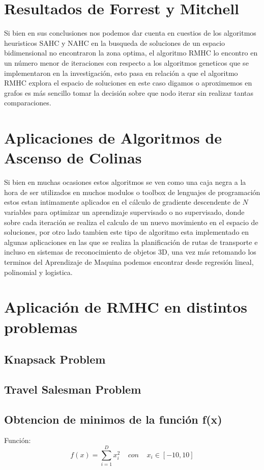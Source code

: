 \documentclass[10pt]{article}
\begin{document}
\section{Resultados de Forrest y Mitchell}
Si bien en sus conclusiones nos podemos dar cuenta en cuestios de los algoritmos heuristicos SAHC y NAHC en la busqueda de soluciones de un espacio bidimensional no encontraron la zona optima, el algoritmo RMHC lo encontro en un número menor de iteraciones con respecto a los algoritmos geneticos que se implementaron en la investigación, esto pasa en relación a que el algoritmo RMHC explora el espacio de soluciones en este caso digamos o aproximemos en grafos es más sencillo tomar la decisión sobre que nodo iterar sin realizar tantas comparaciones.
\section{Aplicaciones de Algoritmos de Ascenso de Colinas}
Si bien en muchas ocasiones estos algoritmos se ven como una caja negra a la hora de ser utilizados en muchos modulos o toolbox de lenguajes de programación estos estan intimamente aplicados en el cálculo de gradiente descendente de $N$ variables para optimizar un aprendizaje supervisado o no supervisado, donde sobre cada iteración se realiza el calculo de un nuevo movimiento en el espacio de soluciones, por otro lado tambien este tipo de algoritmo esta implementado en algunas aplicaciones en las que se realiza la planificación de rutas de transporte e incluso en sistemas de reconocimiento de objetos 3D, una vez más retomando los terminos del Aprendizaje de Maquina podemos encontrar desde regresión lineal, polinomial y logistica.
\section{Aplicación de RMHC en distintos problemas}
\subsection{Knapsack Problem}

\subsection{Travel Salesman Problem}

\subsection{Obtencion de minimos de la función f(x)}
Función:
\[f(x)=\sum_{i=1}^{D}x_{i}^2\;\;\;\;con\;\;\;\;x_{i}\in[-10,10]\]

\end{document}
